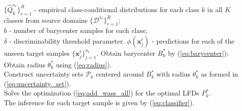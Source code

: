 \documentclass[journal]{IEEEtran}
\begin{document}
\renewcommand{\algorithmicrequire}{ \textbf{Input:}}  
\renewcommand{\algorithmicensure}{ \textbf{Output:}}    %
\begin{algorithm}[t]
  \caption{Wasserstein distributionally robust domain generalization.}
  \label{algorithm}
  \begin{algorithmic}[1]
  \REQUIRE  
  $\{\widehat{Q}^{s_r}_k\}_{r=1}^R$ - empirical class-conditional distributions for each class $k$ in all $K$ classes from source domains $\{\mathcal{D}^{s_r}\}_{r=1}^R$;\\
  $b$ - number of barycenter samples for each class;\\
  $\delta$ - discriminability threshold parameter.
  \ENSURE $\phi(\boldsymbol{x}^t_j)$ - predictions for each of the unseen target samples $\{\boldsymbol{x}_j^t\}_{j=1}^{n_t}$.
    \STATE Obtain barycenter $B^*_k$ by (\ref{eq:barycenter});\\
    \STATE Obtain radius $\theta_k^*$ using (\ref{eq:radius}).\\
    \STATE Construct uncertainty sets $\mathcal{P}_k$ centered around $B^*_k$ with radius $\theta_k^*$ as formed in (\ref{eq:uncertainty_set}).\\
  \ENDFOR
  \STATE Solve the optimization (\ref{eq:add_wass_all}) for the optimal LFDs ${P}^*_k$.\\
  \STATE 
  The inference for each target sample is given by (\ref{eq:classifier}).
  \end{algorithmic}
\end{algorithm}
\end{document}
